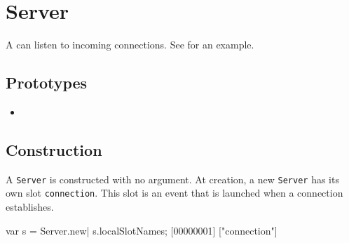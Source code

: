 \section{Server}

A  can listen to incoming connections.  See
 for an example.

\subsection{Prototypes}
\begin{itemize}
\item {}
\end{itemize}

\subsection{Construction}

A \lstinline|Server| is constructed with no argument. At creation, a
new \lstinline|Server| has its own slot \lstinline|connection|. This
slot is an event that is launched when a connection establishes.

\begin{urbiscript}[firstnumber=last]
var s = Server.new|
s.localSlotNames;
[00000001] ["connection"]
\end{urbiscript}

